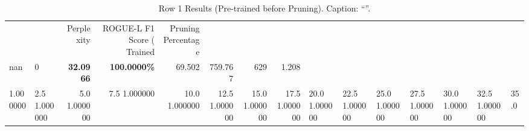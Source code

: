 \begin{table}
\caption{Row 1 Results (Pre-trained before Pruning). \ifshowcaption{}Caption: ``''.\fi}
\label{tab:evaluation-pipeline-1-trained}
\begin{tabular}{llrrrrrr}
 &  & Perplexity & ROGUE-L F1 Score (%
Trained & Pruning Percentage &  &  &  &  &  &  \\
nan & 0 & \bfseries 32.0966 & \bfseries 100.0000\% & 69.502 & 759.767 & 629 & 1.208 \\
1.000000 & 2.5%
1.000000 & 5.0%
1.000000 & 7.5%
1.000000 & 10.0%
1.000000 & 12.5%
1.000000 & 15.0%
1.000000 & 17.5%
1.000000 & 20.0%
1.000000 & 22.5%
1.000000 & 25.0%
1.000000 & 27.5%
1.000000 & 30.0%
1.000000 & 32.5%
1.000000 & 35.0%

\end{tabular}
\end{table}

